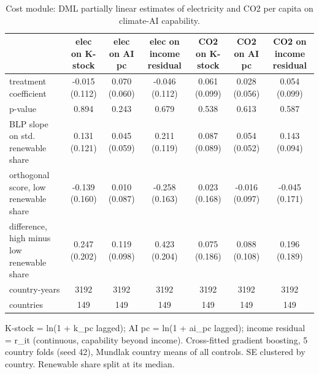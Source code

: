 \begin{table}[htbp]
\centering
\caption{Cost module: DML partially linear estimates of electricity and CO2 per capita on climate-AI capability.}
\label{tab:cost}
\begin{tabular}{lcccccc}
\toprule
 & elec on K-stock & elec on AI pc & elec on income residual & CO2 on K-stock & CO2 on AI pc & CO2 on income residual \\
\midrule
treatment coefficient & -0.015 (0.112) & 0.070 (0.060) & -0.046 (0.112) & 0.061 (0.099) & 0.028 (0.056) & 0.054 (0.099) \\
p-value & 0.894 & 0.243 & 0.679 & 0.538 & 0.613 & 0.587 \\
BLP slope on std. renewable share & 0.131 (0.121) & 0.045 (0.059) & 0.211 (0.119) & 0.087 (0.089) & 0.054 (0.052) & 0.143 (0.094) \\
orthogonal score, low renewable share & -0.139 (0.160) & 0.010 (0.087) & -0.258 (0.163) & 0.023 (0.168) & -0.016 (0.097) & -0.045 (0.171) \\
difference, high minus low renewable share & 0.247 (0.202) & 0.119 (0.098) & 0.423 (0.204) & 0.075 (0.186) & 0.088 (0.108) & 0.196 (0.189) \\
country-years & 3192 & 3192 & 3192 & 3192 & 3192 & 3192 \\
countries & 149 & 149 & 149 & 149 & 149 & 149 \\
\bottomrule
\end{tabular}
\par\smallskip\footnotesize K-stock = ln(1 + k\_pc lagged); AI pc = ln(1 + ai\_pc lagged); income residual = r\_it (continuous, capability beyond income). Cross-fitted gradient boosting, 5 country folds (seed 42), Mundlak country means of all controls. SE clustered by country. Renewable share split at its median.
\end{table}
